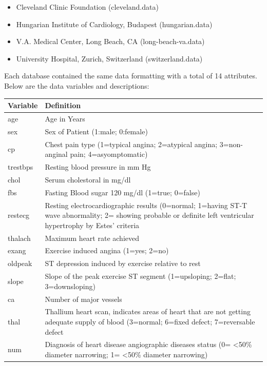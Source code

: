 \documentclass[12pt]{article}
\begin{document}
\begin{itemize} 
  \item Cleveland Clinic Foundation (cleveland.data)
  \item Hungarian Institute of Cardiology, Budapest (hungarian.data)
  \item V.A. Medical Center, Long Beach, CA (long-beach-va.data)
 \item University Hospital, Zurich, Switzerland (switzerland.data)
\end{itemize}
Each database contained the same data formatting with a total of 14 attributes. Below are the data variables and descriptions: 
  \begin{adjustwidth}{-1cm}{}
\begin{tabular}{ |p{2cm}|p{13.5cm}| }
\hline
Variable & Definition\\
\hline
age & Age in Years \\
\hline
sex & Sex of Patient (1:male; 0:female)\\
\hline
cp & Chest pain type (1=typical angina; 2=atypical angina; 3=non-anginal pain; 4=asyomptomatic)\\
\hline
trestbps & Resting blood pressure in mm Hg\\
\hline
chol & Serum cholestoral in mg/dl \\
\hline
fbs & Fasting Blood sugar 120 mg/dl (1=true; 0=false)\\
\hline
restecg & Resting electrocardiographic results (0=normal; 1=having ST-T wave abnormality; 2= showing probable or definite left ventricular hypertrophy by Estes' criteria\\
\hline
thalach & Maximum heart rate achieved\\
\hline
exang & Exercise induced angina (1=yes; 2=no)\\
\hline
oldpeak & ST depression induced by exercise relative to rest\\ 
\hline
slope & Slope of the peak exercise ST segment (1=upsloping; 2=flat; 3=downsloping)\\ 
\hline
ca & Number of major vessels\\
\hline
thal & Thallium heart scan, indicates areas of heart that are not getting adequate supply of blood (3=normal; 6=fixed defect; 7=reversable defect\\
\hline
num & Diagnosis of heart disease angiographic diseases status (0= \textless 50\% diameter narrowing; 1= \textless 50\% diameter narrowing)\\
\hline
\end{tabular}
\end{adjustwidth}
\end{document}
